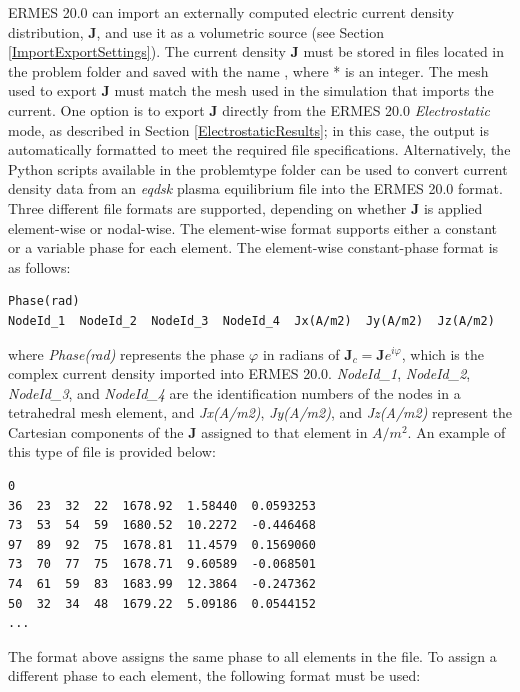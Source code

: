 ERMES 20.0 can import an externally computed electric current density distribution, $\mathbf{J}$, and use it as a volumetric source (see Section \ref{ImportExportSettings}). The current density $\mathbf{J}$ must be stored in files located in the problem folder  and saved with the name , where * is an integer. The mesh used to export $\mathbf{J}$ must match the mesh used in the simulation that imports the current. One option is to export $\mathbf{J}$ directly from the ERMES 20.0 \textit{Electrostatic} mode, as described in Section \ref{ElectrostaticResults}; in this case, the output is automatically formatted to meet the required file specifications. Alternatively, the Python scripts available in the problemtype folder  can be used to convert current density data from an \textit{eqdsk} plasma equilibrium file into the ERMES 20.0 format. Three different file formats are supported, depending on whether $\mathbf{J}$ is applied element-wise or nodal-wise. The element-wise format supports either a constant or a variable phase for each element. The element-wise constant-phase format is as follows:
\begin{small}\begin{lstlisting}
Phase(rad)
NodeId_1  NodeId_2  NodeId_3  NodeId_4  Jx(A/m2)  Jy(A/m2)  Jz(A/m2)
\end{lstlisting}\end{small} 
where \textit{Phase(rad)} represents the phase $\varphi$ in radians of $\mathbf{J}_{c} = \mathbf{J}e^{i\varphi}$, which is the complex current density imported into ERMES 20.0. \textit{NodeId\_1}, \textit{NodeId\_2}, \textit{NodeId\_3}, and  \textit{NodeId\_4} are the identification numbers of the nodes in a tetrahedral mesh element, and \textit{Jx(A/m2)}, \textit{Jy(A/m2)}, and \textit{Jz(A/m2)} represent the Cartesian components of the \textbf{J} assigned to that element in $A/m^{2}$. An example of this type of file is provided below:
\begin{small}\begin{lstlisting}
0
36  23  32  22  1678.92  1.58440  0.0593253
73  53  54  59  1680.52  10.2272  -0.446468
97  89  92  75  1678.81  11.4579  0.1569060
73  70  77  75  1678.71  9.60589  -0.068501
74  61  59  83  1683.99  12.3864  -0.247362
50  32  34  48  1679.22  5.09186  0.0544152
...
\end{lstlisting}\end{small}
The format above assigns the same phase to all elements in the file. To assign a different phase to each element, the following format must be used:
